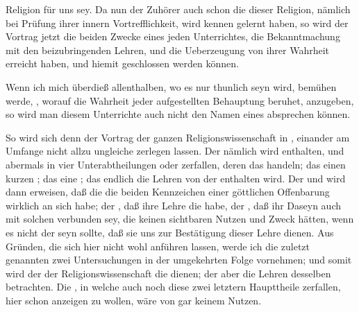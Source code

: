 \begin{aufza}
Religion für uns sey. Da nun der Zuhörer auch schon die  dieser Religion, nämlich bei Prüfung ihrer innern Vortrefflichkeit, wird kennen gelernt haben, so wird der Vortrag jetzt die beiden Zwecke eines jeden Unterrichtes, die Bekanntmachung mit den beizubringenden Lehren, und die Ueberzeugung von ihrer Wahrheit erreicht haben, und hiemit geschlossen werden können.
\item Wenn ich mich überdieß allenthalben, wo es nur thunlich seyn wird, bemühen werde, , worauf die Wahrheit jeder aufgestellten Behauptung beruhet, anzugeben, so wird man diesem Unterrichte auch nicht den Namen eines  absprechen können.
\item So wird sich denn der Vortrag der ganzen Religionswissenschaft in , einander am Umfange nicht allzu ungleiche  zerlegen lassen. Der  nämlich wird  enthalten, und abermals in vier Unterabtheilungen oder  zerfallen, deren das  handeln; das  einen kurzen ; das  eine ; das  endlich die Lehren von der  enthalten wird. Der  und  wird dann erweisen, daß die  die beiden Kennzeichen einer göttlichen Offenbarung wirklich an sich habe; der , daß ihre Lehre die  habe, der , daß ihr Daseyn auch mit solchen  verbunden sey, die keinen sichtbaren Nutzen und Zweck hätten, wenn es nicht der seyn sollte, daß sie uns zur Bestätigung dieser Lehre dienen. Aus Gründen, die sich hier nicht wohl anführen lassen, werde ich die zuletzt genannten zwei Untersuchungen in der umgekehrten Folge vornehmen; und somit wird der  der Religionswissenschaft die  dienen; der  aber die Lehren desselben betrachten. Die , in welche auch noch diese zwei letztern Haupttheile zerfallen, hier schon anzeigen zu wollen, wäre von gar keinem Nutzen.
\end{aufza}

